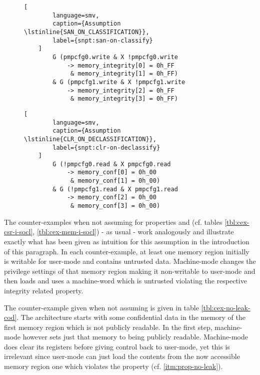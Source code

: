 \begin{figure}
    \begin{lstlisting}[
        language=smv,
        caption={Assumption \lstinline{SAN_ON_CLASSIFICATION}},
        label={snpt:san-on-classify}
    ]
        G (pmpcfg0.write & X !pmpcfg0.write
            -> memory_integrity[0] = 0h_FF
             & memory_integrity[1] = 0h_FF)
        & G (pmpcfg1.write & X !pmpcfg1.write
            -> memory_integrity[2] = 0h_FF
             & memory_integrity[3] = 0h_FF)
    \end{lstlisting}

    \begin{lstlisting}[
        language=smv,
        caption={Assumption \lstinline{CLR_ON_DECLASSIFICATION}},
        label={snpt:clr-on-declassify}
    ]
        G (!pmpcfg0.read & X pmpcfg0.read
            -> memory_conf[0] = 0h_00
             & memory_conf[1] = 0h_00)
        & G (!pmpcfg1.read & X pmpcfg1.read
            -> memory_conf[2] = 0h_00
             & memory_conf[3] = 0h_00)
    \end{lstlisting}
\end{figure}

The counter-examples when not assuming  for properties  and  (cf. tables \ref{tbl:cex-csr-i-socl}, \ref{tbl:cex-mem-i-socl}) - as usual - work analogously and illustrate exactly what has been given as intuition for this assumption in the introduction of this paragraph.
In each counter-example, at least one memory region initially is writable for user-mode and contains untrusted data.
Machine-mode changes the privilege settings of that memory region making it non-writable to user-mode and then loads and uses a machine-word which is untrusted violating the respective integrity related property.

The counter-example given when not assuming  is given in table \ref{tbl:cex-no-leak-cod}.
The architecture starts with some confidential data in the memory of the first memory region which is not publicly readable.
In the first step, machine-mode however sets just that memory to being publicly readable.
Machine-mode does clear its registers before giving control back to user-mode, yet this is irrelevant since user-mode can just load the contents from the now accessible memory region one which violates the  property (cf. \ref{itm:prop-no-leak}).

